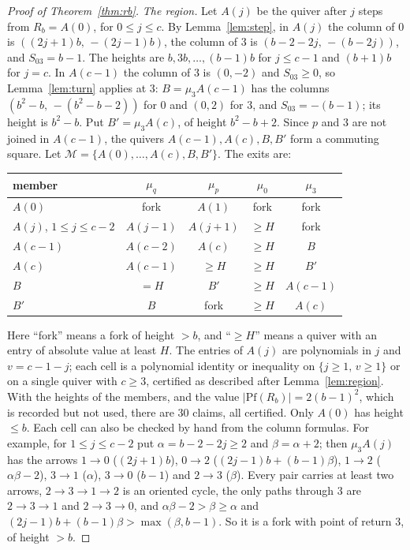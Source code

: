 \documentclass[11pt]{amsart}
\theoremstyle{definition}
\theoremstyle{remark}
\newcommand{\cM}{\mathcal{M}}
\begin{document}
\begin{proof}[Proof of Theorem~\ref{thm:rb}]
\emph{The region.} Let $A(j)$ be the quiver after $j$ steps from $R_b=A(0)$, for $0\le j\le c$. By Lemma~\ref{lem:step}, in $A(j)$ the column of $0$ is $((2j+1)b,\,-(2j-1)b)$, the column of $3$ is $(b-2-2j,\,-(b-2j))$, and $S_{03}=b-1$. The heights are $b,3b,\dots,(b-1)b$ for $j\le c-1$ and $(b+1)b$ for $j=c$. In $A(c-1)$ the column of $3$ is $(0,-2)$ and $S_{03}\ge0$, so Lemma~\ref{lem:turn} applies at $3$: $B=\mu_3A(c-1)$ has the columns $(b^2-b,\,-(b^2-b-2))$ for $0$ and $(0,2)$ for $3$, and $S_{03}=-(b-1)$; its height is $b^2-b$. Put $B'=\mu_3A(c)$, of height $b^2-b+2$. Since $p$ and $3$ are not joined in $A(c-1)$, the quivers $A(c-1),A(c),B,B'$ form a commuting square. Let $\cM=\{A(0),\dots,A(c),B,B'\}$. The exits are:
\begin{center}
\begin{tabular}{lcccc}
\toprule
member & $\mu_q$ & $\mu_p$ & $\mu_0$ & $\mu_3$\\
\midrule
$A(0)$ & fork & $A(1)$ & fork & fork\\
$A(j)$, $1\le j\le c-2$ & $A(j-1)$ & $A(j+1)$ & $\ge H$ & fork\\
$A(c-1)$ & $A(c-2)$ & $A(c)$ & $\ge H$ & $B$\\
$A(c)$ & $A(c-1)$ & $\ge H$ & $\ge H$ & $B'$\\
$B$ & $=H$ & $B'$ & $\ge H$ & $A(c-1)$\\
$B'$ & $B$ & fork & $\ge H$ & $A(c)$\\
\bottomrule
\end{tabular}
\end{center}
Here ``fork'' means a fork of height $>b$, and ``$\ge H$'' means a quiver with an entry of absolute value at least $H$. The entries of $A(j)$ are polynomials in $j$ and $v=c-1-j$; each cell is a polynomial identity or inequality on $\{j\ge1,\,v\ge1\}$ or on a single quiver with $c\ge3$, certified as described after Lemma~\ref{lem:region}. With the heights of the members, and the value $|\mathrm{Pf}(R_b)|=2(b-1)^2$, which is recorded but not used, there are $30$ claims, all certified. Only $A(0)$ has height $\le b$. Each cell can also be checked by hand from the column formulas. For example, for $1\le j\le c-2$ put $\alpha=b-2-2j\ge2$ and $\beta=\alpha+2$; then $\mu_3A(j)$ has the arrows $1\to0$ ($(2j+1)b$), $0\to2$ ($(2j-1)b+(b-1)\beta$), $1\to2$ ($\alpha\beta-2$), $3\to1$ ($\alpha$), $3\to0$ ($b-1$) and $2\to3$ ($\beta$). Every pair carries at least two arrows, $2\to3\to1\to2$ is an oriented cycle, the only paths through $3$ are $2\to3\to1$ and $2\to3\to0$, and $\alpha\beta-2>\beta\ge\alpha$ and $(2j-1)b+(b-1)\beta>\max(\beta,b-1)$. So it is a fork with point of return $3$, of height $>b$.


\end{proof}
\end{document}
